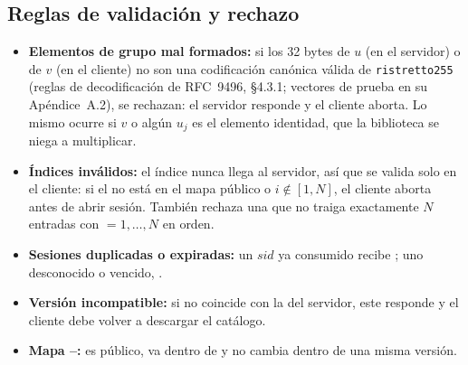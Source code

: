 \subsection{Reglas de validaci\'on y rechazo}
\begin{itemize}
\item \textbf{Elementos de grupo mal formados:} si los 32 bytes de $u$ (en
el servidor) o de $v$ (en el cliente) no son una codificaci\'on can\'onica
v\'alida de \texttt{ristretto255} (reglas de decodificaci\'on de RFC~9496,
\S4.3.1; vectores de prueba en su Ap\'endice~A.2), se rechazan: el servidor
responde  y el cliente aborta. Lo mismo ocurre si $v$ o
alg\'un $u_j$ es el elemento identidad, que la biblioteca se niega a
multiplicar.
\item \textbf{\'Indices inv\'alidos:} el \'indice nunca llega al servidor,
as\'i que se valida solo en el cliente: si el  no est\'a en
el mapa p\'ublico o $i \notin [1,N]$, el cliente aborta antes de abrir
sesi\'on. Tambi\'en rechaza una  que no traiga exactamente
$N$ entradas con  $= 1,\dots,N$ en orden.
\item \textbf{Sesiones duplicadas o expiradas:} un $sid$ ya consumido recibe
; uno desconocido o vencido, .
\item \textbf{Versi\'on incompatible:} si  no coincide
con la del servidor, este responde  y el
cliente debe volver a descargar el cat\'alogo.
\item \textbf{Mapa --:} es p\'ublico, va dentro de
 y no cambia dentro de una misma versi\'on.
\end{itemize}
